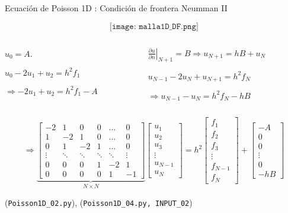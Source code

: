 \documentclass[handout]{beamer}
\begin{document}
\begin{frame}{Ecuaci\'on de Poisson 1D : Condici\'on de frontera Neumman II}

$$\texttt{[image: malla1D\_DF.png]}$$

\begin{footnotesize}
\begin{columns}
\begin{column}{0.45\textwidth}
$ u_0  = A $.

$u_{0} - 2 u_{1} + u_{2} = h^2 f_1$ 

$\Rightarrow \boxed{-2 u_{1} + u_{2} = h^2 f_1 - A}$
\end{column}
\begin{column}{0.5\textwidth}
$\left.\displaystyle \frac{\partial u}{\partial n}\right|_{N+1}  = B \Longrightarrow \boxed{u_{N+1} = h B + u_{N}}$  

$u_{N-1} - 2 u_{N} + u_{N+1} = h^2 f_N$

$\Rightarrow \boxed{u_{N-1} - u_{N} = h^2 f_N - hB}$
\end{column}
\end{columns}

\pause

\vspace{0.25cm}

\[
\Longrightarrow
\underbrace{
\left[
  \begin{matrix}
    -2 & 1 & 0 & 0 & \dots & 0  \\
    1 & -2 & 1 & 0 & \dots & 0  \\
    0 & 1 & -2 & 1 & \dots & 0  \\
    \vdots & \ddots & \ddots & \ddots & \ddots & \vdots \\
    0 & 0 & 0 & 1 & -2 & 1   \\
    0 & 0 & 0 & 0 & 1 & -1    
  \end{matrix}
\right] }_{N \times N}
\left[
\begin{matrix}
u_1 \\ u_2 \\ u_3 \\ \vdots \\ u_{N-1} \\ u_N
\end{matrix}
\right]= 
h^2 \left[
\begin{matrix}
f_1 \\ f_2 \\ f_3 \\ \vdots \\ f_{N-1} \\ f_N
\end{matrix}
\right] +
\left[
\begin{matrix}
-A \\ 0 \\ 0 \\ \vdots \\ 0 \\ -hB
\end{matrix}
\right]
\]

(\texttt{Poisson1D\_02.py}), (\texttt{Poisson1D\_04.py, INPUT\_02})

\end{footnotesize}

\end{frame}
\end{document}
